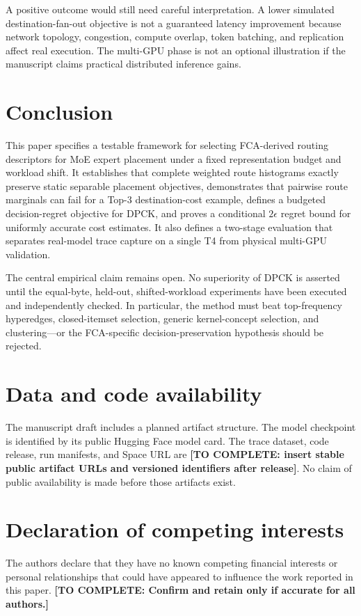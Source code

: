 \documentclass[a4paper,preprint,review,12pt,authoryear]{elsarticle}
\newcommand{\todo}[1]{\textcolor{red!75!black}{\textbf{[TO COMPLETE: #1]}}}
\begin{document}
A positive outcome would still need careful interpretation. A lower simulated destination-fan-out objective is not a guaranteed latency improvement because network topology, congestion, compute overlap, token batching, and replication affect real execution. The multi-GPU phase is not an optional illustration if the manuscript claims practical distributed inference gains.

\section{Conclusion}

This paper specifies a testable framework for selecting FCA-derived routing descriptors for MoE expert placement under a fixed representation budget and workload shift. It establishes that complete weighted route histograms exactly preserve static separable placement objectives, demonstrates that pairwise route marginals can fail for a Top-3 destination-cost example, defines a budgeted decision-regret objective for DPCK, and proves a conditional $2\epsilon$ regret bound for uniformly accurate cost estimates. It also defines a two-stage evaluation that separates real-model trace capture on a single T4 from physical multi-GPU validation.

The central empirical claim remains open. No superiority of DPCK is asserted until the equal-byte, held-out, shifted-workload experiments have been executed and independently checked. In particular, the method must beat top-frequency hyperedges, closed-itemset selection, generic kernel-concept selection, and clustering—or the FCA-specific decision-preservation hypothesis should be rejected.

\section*{Data and code availability}
The manuscript draft includes a planned artifact structure. The model checkpoint is identified by its public Hugging Face model card. The trace dataset, code release, run manifests, and Space URL are \todo{insert stable public artifact URLs and versioned identifiers after release}. No claim of public availability is made before those artifacts exist.

\section*{Declaration of competing interests}
The authors declare that they have no known competing financial interests or personal relationships that could have appeared to influence the work reported in this paper. \todo{Confirm and retain only if accurate for all authors.}
\end{document}
